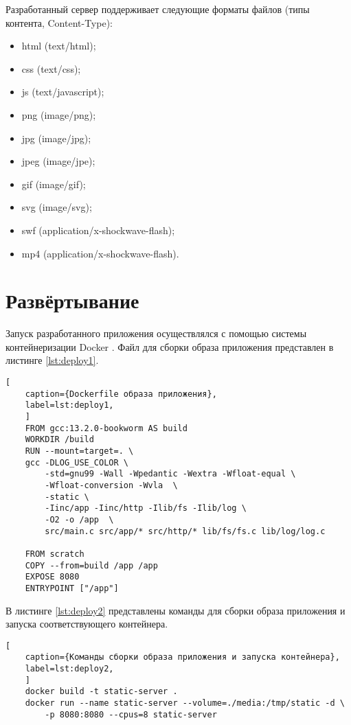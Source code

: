 Разработанный сервер поддерживает следующие форматы файлов (типы контента, Content-Type):

\begin{itemize}[label*=---]
	\item html (text/html);
	\item css (text/css);
	\item js (text/javascript);
	\item png (image/png);
	\item jpg (image/jpg);
	\item jpeg (image/jpe);
	\item gif (image/gif);
	\item svg (image/svg);
	\item swf (application/x-shockwave-flash);
	\item mp4 (application/x-shockwave-flash).
\end{itemize}



\section{Развёртывание}

Запуск разработанного приложения осуществлялся с помощью системы контейнеризации Docker \cite{docker}. Файл для сборки образа приложения представлен в листинге \ref{lst:deploy1}.

\begin{lstlisting}[
	caption={Dockerfile образа приложения},
	label=lst:deploy1,
	]
	FROM gcc:13.2.0-bookworm AS build
	WORKDIR /build
	RUN --mount=target=. \
	gcc -DLOG_USE_COLOR \
		-std=gnu99 -Wall -Wpedantic -Wextra -Wfloat-equal \
		-Wfloat-conversion -Wvla  \
		-static \
		-Iinc/app -Iinc/http -Ilib/fs -Ilib/log \
		-O2 -o /app  \
		src/main.c src/app/* src/http/* lib/fs/fs.c lib/log/log.c
	
	FROM scratch
	COPY --from=build /app /app
	EXPOSE 8080
	ENTRYPOINT ["/app"]
\end{lstlisting}

\clearpage
В листинге \ref{lst:deploy2} представлены команды для сборки образа приложения и запуска соответствующего контейнера.

\begin{lstlisting}[
	caption={Команды сборки образа приложения и запуска контейнера},
	label=lst:deploy2,
	]
	docker build -t static-server .
	docker run --name static-server --volume=./media:/tmp/static -d \
		-p 8080:8080 --cpus=8 static-server
\end{lstlisting}


